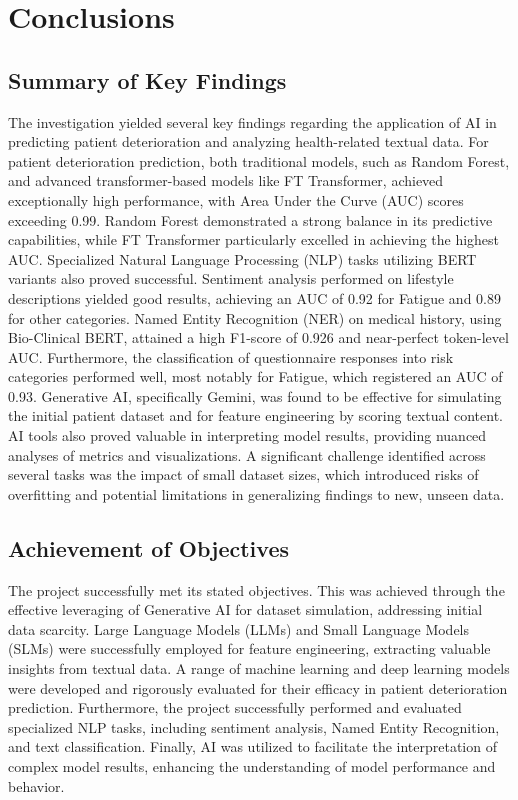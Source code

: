 \section{Conclusions}

\subsection{Summary of Key Findings}

The investigation yielded several key findings regarding the application of AI in predicting patient deterioration and analyzing health-related textual data. For patient deterioration prediction, both traditional models, such as Random Forest, and advanced transformer-based models like FT Transformer, achieved exceptionally high performance, with Area Under the Curve (AUC) scores exceeding 0.99. Random Forest demonstrated a strong balance in its predictive capabilities, while FT Transformer particularly excelled in achieving the highest AUC. Specialized Natural Language Processing (NLP) tasks utilizing BERT variants also proved successful. Sentiment analysis performed on lifestyle descriptions yielded good results, achieving an AUC of 0.92 for Fatigue and 0.89 for other categories. Named Entity Recognition (NER) on medical history, using Bio-Clinical BERT, attained a high F1-score of 0.926 and near-perfect token-level AUC. Furthermore, the classification of questionnaire responses into risk categories performed well, most notably for Fatigue, which registered an AUC of 0.93. Generative AI, specifically Gemini, was found to be effective for simulating the initial patient dataset and for feature engineering by scoring textual content. AI tools also proved valuable in interpreting model results, providing nuanced analyses of metrics and visualizations. A significant challenge identified across several tasks was the impact of small dataset sizes, which introduced risks of overfitting and potential limitations in generalizing findings to new, unseen data.

\subsection{Achievement of Objectives}

The project successfully met its stated objectives. This was achieved through the effective leveraging of Generative AI for dataset simulation, addressing initial data scarcity. Large Language Models (LLMs) and Small Language Models (SLMs) were successfully employed for feature engineering, extracting valuable insights from textual data. A range of machine learning and deep learning models were developed and rigorously evaluated for their efficacy in patient deterioration prediction. Furthermore, the project successfully performed and evaluated specialized NLP tasks, including sentiment analysis, Named Entity Recognition, and text classification. Finally, AI was utilized to facilitate the interpretation of complex model results, enhancing the understanding of model performance and behavior.

